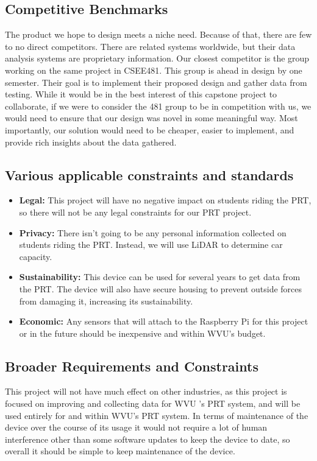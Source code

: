 \subsection{Competitive Benchmarks}
The product we hope to design meets a niche need. Because of that, there are few to no direct competitors. There are related systems worldwide, but their data analysis systems are proprietary information. Our closest competitor is the group working on the same project in CSEE481. This group is ahead in design by one semester. Their goal is to implement their proposed design and gather data from testing. While it would be in the best interest of this capstone project to collaborate, if we were to consider the 481 group to be in competition with us, we would need to ensure that our design was novel in some meaningful way. Most importantly, our solution would need to be cheaper, easier to implement, and provide rich insights about the data gathered.

\subsection{Various applicable constraints and standards}
\begin{itemize}
    \item \textbf{Legal:} This project will have no negative impact on students riding the PRT, so there will not be any legal constraints for our PRT project.
    \item \textbf{Privacy:} There isn't going to be any personal information collected on students riding the PRT. Instead, we will use LiDAR to determine car capacity.
    \item \textbf{Sustainability:} This device can be used for several years to get data from the PRT. The device will also have secure housing to prevent outside forces from damaging it, increasing its sustainability.
    \item \textbf{Economic:} Any sensors that will attach to the Raspberry Pi for this project or in the future should be inexpensive and within WVU’s budget.
\end{itemize}

\subsection{Broader Requirements and Constraints}
This project will not have much effect on other industries, as this project is focused on improving and collecting data for WVU 's PRT system, and will be used entirely for and within WVU’s PRT system. In terms of maintenance of the device over the course of its usage it would not require a lot of human interference other than some software updates to keep the device to date, so overall it should be simple to keep maintenance of the device.